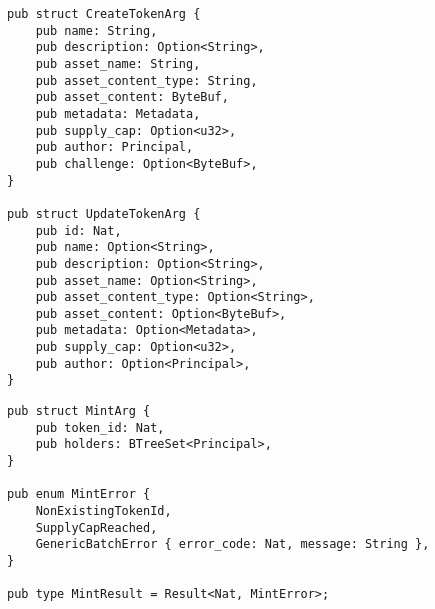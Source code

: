 \documentclass[11pt]{article}
\begin{document}
\begin{verbatim}
pub struct CreateTokenArg {
    pub name: String,
    pub description: Option<String>,
    pub asset_name: String,
    pub asset_content_type: String,
    pub asset_content: ByteBuf,
    pub metadata: Metadata,
    pub supply_cap: Option<u32>,
    pub author: Principal,
    pub challenge: Option<ByteBuf>,
}

pub struct UpdateTokenArg {
    pub id: Nat,
    pub name: Option<String>,
    pub description: Option<String>,
    pub asset_name: Option<String>,
    pub asset_content_type: Option<String>,
    pub asset_content: Option<ByteBuf>,
    pub metadata: Option<Metadata>,
    pub supply_cap: Option<u32>,
    pub author: Option<Principal>,
}
\end{verbatim}

\begin{verbatim}
pub struct MintArg {
    pub token_id: Nat,
    pub holders: BTreeSet<Principal>,
}

pub enum MintError {
    NonExistingTokenId,
    SupplyCapReached,
    GenericBatchError { error_code: Nat, message: String },
}

pub type MintResult = Result<Nat, MintError>;

\end{verbatim}
\end{document}
